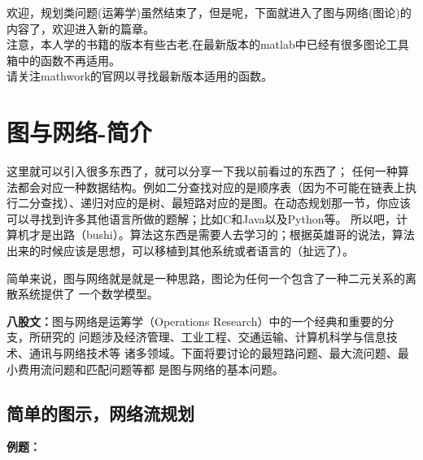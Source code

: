 \documentclass[a4paper,20pt]{article}
\title{}
\author{}
\date{}
\begin{document}
\renewcommand{\lstlistlistingname}{代码汇总}
\renewcommand{\lstlistingname}{代码}
\renewcommand\tablename{表}
欢迎，规划类问题(运筹学)虽然结束了，但是呢，下面就进入了图与网络(图论)的内容了，欢迎进入新的篇章。
\\注意，本人学的书籍的版本有些古老,在最新版本的matlab中已经有很多图论工具箱中的函数不再适用。
\\请关注mathwork的官网以寻找最新版本适用的函数。
\section{图与网络-简介}
这里就可以引入很多东西了，就可以分享一下我以前看过的东西了；
任何一种算法都会对应一种数据结构。例如二分查找对应的是顺序表（因为不可能在链表上执行二分查找）、递归对应的是树、最短路对应的是图。在动态规划那一节，你应该可以寻找到许多其他语言所做的题解；比如C和Java以及Python等。
所以吧，计算机才是出路（bushi）。算法这东西是需要人去学习的；根据英雄哥的说法，算法出来的时候应该是思想，可以移植到其他系统或者语言的（扯远了）。
\par 简单来说，图与网络就是就是一种思路，图论为任何一个包含了一种二元关系的离散系统提供了
一个数学模型。

\par \textbf{八股文：}图与网络是运筹学（Operations Research）中的一个经典和重要的分支，所研究的
问题涉及经济管理、工业工程、交通运输、计算机科学与信息技术、通讯与网络技术等
诸多领域。下面将要讨论的最短路问题、最大流问题、最小费用流问题和匹配问题等都
是图与网络的基本问题。

\subsection{简单的图示，网络流规划}

\par \textbf{例题：}
\par \noindent {}
\end{document}
